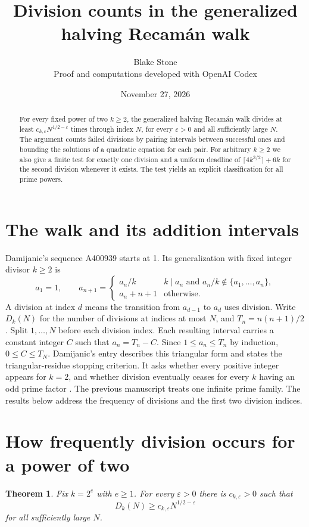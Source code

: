 \documentclass[10pt]{article}
\title{Division counts in the generalized halving Recam\'an walk}
\author{Blake Stone\\\small Proof and computations developed with OpenAI Codex}
\date{November 27, 2026}
\newtheorem{theorem}{Theorem}
\begin{document}
\maketitle
\begin{abstract}
For every fixed power of two $k\ge2$, the generalized halving Recam\'an walk divides at least $c_{k,\varepsilon}N^{1/2-\varepsilon}$ times through index $N$, for every $\varepsilon>0$ and all sufficiently large $N$. The argument counts failed divisions by pairing intervals between successful ones and bounding the solutions of a quadratic equation for each pair. For arbitrary $k\ge2$ we also give a finite test for exactly one division and a uniform deadline of $\lceil4k^{3/2}\rceil+6k$ for the second division whenever it exists. The test yields an explicit classification for all prime powers.
\end{abstract}

\section{The walk and its addition intervals}
Damijanic's sequence A400939 starts at 1. Its generalization with fixed integer divisor $k\ge2$ is
\[
 a_1=1,\qquad
 a_{n+1}=\begin{cases}
 a_n/k & k\mid a_n\text{ and }a_n/k\notin\{a_1,\ldots,a_n\},\\
 a_n+n+1 & \text{otherwise}.
 \end{cases}
\]
A division at index $d$ means the transition from $a_{d-1}$ to $a_d$ uses division. Write $D_k(N)$ for the number of divisions at indices at most $N$, and $T_n=n(n+1)/2$. Split $1,\ldots,N$ before each division index. Each resulting interval carries a constant integer $C$ such that $a_n=T_n-C$. Since $1\le a_n\le T_n$ by induction, $0\le C\le T_N$. Damijanic's entry describes this triangular form and states the triangular-residue stopping criterion. It asks whether every positive integer appears for $k=2$, and whether division eventually ceases for every $k$ having an odd prime factor \cite{OEIS}. The previous manuscript \cite{prime} treats one infinite prime family. The results below address the frequency of divisions and the first two division indices.

\section{How frequently division occurs for a power of two}
\begin{theorem}\label{main}
Fix $k=2^e$ with $e\ge1$. For every $\varepsilon>0$ there is $c_{k,\varepsilon}>0$ such that
\[
 D_k(N)\ge c_{k,\varepsilon}N^{1/2-\varepsilon}
\]
for all sufficiently large $N$.
\end{theorem}
\end{document}
